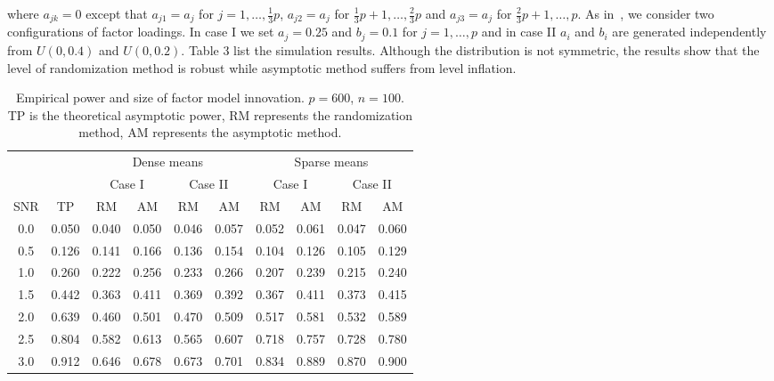 \documentclass[review]{elsarticle}
\theoremstyle{plain}
\theoremstyle{definition}
\theoremstyle{remark}
\begin{document}
where $a_{jk}=0$ except that $a_{j1}=a_j$ for $j=1,\ldots,\frac{1}{3}p$, $a_{j2}=a_j$ for $\frac{1}{3}p+1,\ldots,\frac{2}{3}p$ and $a_{j3}=a_j$ for $\frac{2}{3}p+1,\ldots,p$.
As in~\cite{fan2007to}, we consider two configurations of factor loadings. In  case I we set $a_j=0.25$ and $b_j=0.1$ for $j=1,\ldots, p$ and in case II $a_i$ and $b_i$ are generated independently from $U(0,0.4)$ and $U(0,0.2)$.
Table 3 list the simulation results. Although the distribution is not symmetric, the results show that the level of randomization method is robust while asymptotic method suffers from level inflation.

\begin{table}[ht]
    \caption{Empirical power and size of factor model innovation.  $p=600$, $n=100$. TP is the theoretical asymptotic power, RM represents the randomization method, AM represents the asymptotic method.}
    \centering
    \begin{tabular}{cccccccccc}
          \toprule
          & & \multicolumn{4}{c}{Dense means} &\multicolumn{4}{c}{Sparse means}\\
          \cmidrule(r){3-6}\cmidrule(r){7-10}
          & & \multicolumn{2}{c}{Case I} & \multicolumn{2}{c}{Case II} & \multicolumn{2}{c}{Case I}& \multicolumn{2}{c}{Case II}\\
          \cmidrule(r){3-4}  \cmidrule(r){5-6} \cmidrule(r){7-8}  \cmidrule(r){9-10}
           SNR& TP & RM & AM & RM & AM & RM & AM & RM & AM  \\ 
            \midrule
    0.0 & 0.050 & 0.040 & 0.050 & 0.046 & 0.057 & 0.052 & 0.061 & 0.047 & 0.060 \\ 
      0.5 & 0.126 & 0.141 & 0.166 & 0.136 & 0.154 & 0.104 & 0.126 & 0.105 & 0.129 \\ 
    1.0 & 0.260 & 0.222 & 0.256 & 0.233 & 0.266 & 0.207 & 0.239 & 0.215 & 0.240 \\ 
      1.5 & 0.442 & 0.363 & 0.411 & 0.369 & 0.392 & 0.367 & 0.411 & 0.373 & 0.415 \\ 
    2.0 & 0.639 & 0.460 & 0.501 & 0.470 & 0.509 & 0.517 & 0.581 & 0.532 & 0.589 \\ 
      2.5 & 0.804 & 0.582 & 0.613 & 0.565 & 0.607 & 0.718 & 0.757 & 0.728 & 0.780 \\ 
    3.0 & 0.912 & 0.646 & 0.678 & 0.673 & 0.701 & 0.834 & 0.889 & 0.870 & 0.900 \\ 
        \bottomrule
    \end{tabular}
\end{table}
\end{document}
